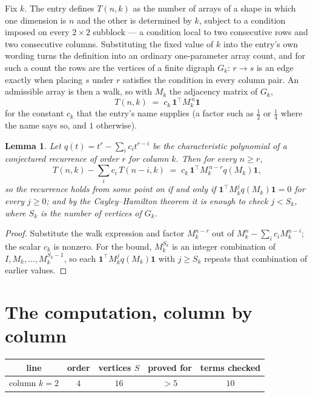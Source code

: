\documentclass[11pt,a4paper]{article}
\theoremstyle{plain}
\newtheorem{lemma}[theorem]{Lemma}
\theoremstyle{definition}
\begin{document}
Fix $k$. The entry defines $T(n,k)$ as the number of arrays of a shape in which one dimension
is $n$ and the other is determined by $k$, subject to a condition imposed on every
$2\times2$ subblock --- a condition local to two consecutive rows and two consecutive columns.
Substituting the fixed value of $k$ into the entry's own wording turns the definition into an
ordinary one-parameter array count, and for such a count the rows are the vertices of a finite
digraph $G_k$: $r\to s$ is an edge exactly when placing $s$ under $r$ satisfies the condition
in every column pair. An admissible array is then a walk, so with $M_k$ the adjacency matrix
of $G_k$,
\[
T(n,k)\;=\;c_k\,\mathbf{1}^{\!\top}M_k^{\,n}\mathbf{1}
\]
for the constant $c_k$ that the entry's name supplies (a factor such as $\tfrac12$ or
$\tfrac14$ where the name says so, and $1$ otherwise).

\begin{lemma}\label{lem:crit}
Let $q(t)=t^{r}-\sum_i c_it^{r-i}$ be the characteristic polynomial of a conjectured
recurrence of order $r$ for column $k$. Then for every $n\ge r$,
\[
T(n,k)-\sum_i c_i\,T(n-i,k)\;=\;c_k\,\mathbf{1}^{\!\top}M_k^{\,n-r}q(M_k)\mathbf{1},
\]
so the recurrence holds from some point on if and only if
$\mathbf{1}^{\!\top}M_k^{j}q(M_k)\mathbf{1}=0$ for every $j\ge0$; and by the
Cayley--Hamilton theorem it is enough to check $j<S_k$, where $S_k$ is the number of vertices
of $G_k$.
\end{lemma}

\begin{proof}
Substitute the walk expression and factor $M_k^{n-r}$ out of $M_k^{n}-\sum_ic_iM_k^{n-i}$;
the scalar $c_k$ is nonzero. For the bound, $M_k^{S_k}$ is an integer combination of
$I,M_k,\dots,M_k^{S_k-1}$, so each $\mathbf{1}^{\!\top}M_k^{j}q(M_k)\mathbf{1}$ with
$j\ge S_k$ repeats that combination of earlier values.
\end{proof}

\section{The computation, column by column}

\begin{center}
\begin{tabular}{ccccc}
line & order & vertices $S$ & proved for & terms checked \\ \hline
column $k$$=2$ & $4$ & $16$ & $>5$ & $10$ \\
\end{tabular}
\end{center}
\end{document}
